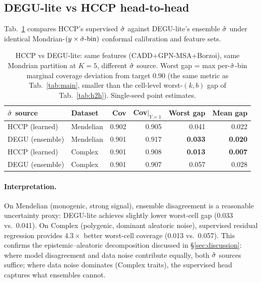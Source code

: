 \subsection{DEGU-lite vs HCCP head-to-head}
\label{app:tables:degu}

Tab.~\ref{tab:degu} compares HCCP's supervised $\hat{\sigma}$ against DEGU-lite's ensemble $\hat{\sigma}$ under identical Mondrian-$(y \times \hat{\sigma}\text{-bin})$ conformal calibration and feature sets.

\begin{table}[h]
\centering
\small
\caption{HCCP vs DEGU-lite: same features (CADD+GPN-MSA+Borzoi), same Mondrian partition at $K = 5$, different $\hat{\sigma}$ source. Worst gap = max per-$\hat{\sigma}$-bin marginal coverage deviation from target $0.90$ (the same metric as Tab.~\ref{tab:main}, smaller than the cell-level worst-$(k,b)$ gap of Tab.~\ref{tab:h2h}). Single-seed point estimates.}
\label{tab:degu}
\begin{tabular}{llrrrr}
\toprule
$\hat{\sigma}$ source & Dataset & Cov & Cov$|_{Y{=}1}$ & Worst gap & Mean gap \\
\midrule
HCCP (learned)    & Mendelian & 0.902 & 0.905 & 0.041 & 0.022 \\
DEGU (ensemble)   & Mendelian & 0.901 & 0.917 & \textbf{0.033} & \textbf{0.020} \\
\midrule
HCCP (learned)    & Complex   & 0.901 & 0.908 & \textbf{0.013} & \textbf{0.007} \\
DEGU (ensemble)   & Complex   & 0.901 & 0.907 & 0.057 & 0.028 \\
\bottomrule
\end{tabular}
\end{table}

\paragraph{Interpretation.}
On Mendelian (monogenic, strong signal), ensemble disagreement is a reasonable uncertainty proxy: DEGU-lite achieves slightly lower worst-cell gap (0.033 vs.\ 0.041). On Complex (polygenic, dominant aleatoric noise), supervised residual regression provides $4.3\times$ better worst-cell coverage (0.013 vs.\ 0.057). This confirms the epistemic--aleatoric decomposition discussed in §\ref{sec:discussion}: where model disagreement and data noise contribute equally, both $\hat{\sigma}$ sources suffice; where data noise dominates (Complex traits), the supervised head captures what ensembles cannot.

